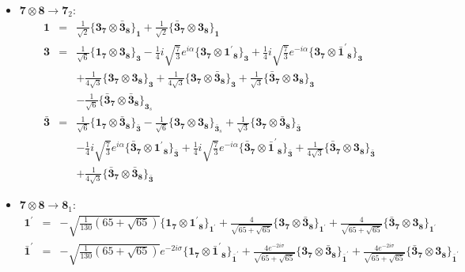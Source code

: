 \documentclass[english]{article}
\newcommand{\subcg}[3]{\big\{ {#1}\otimes{#2}\big\}^{}_{#3}}
\newcommand{\rep}[1]{\mathbf{#1}}
\begin{document}
\begin{itemize}
\item $\rep{7}\otimes\rep{8}\to\rep{7}_{2}$:
\begin{eqnarray*}
\rep{1} &=& \frac{1}{\sqrt{2}}\subcg{\rep{3}_{\rep{7}}}{\rep{\bar{3}}_{\rep{8}}}{\rep{1}}+\frac{1}{\sqrt{2}}\subcg{\rep{\bar{3}}_{\rep{7}}}{\rep{3}_{\rep{8}}}{\rep{1}}
\\
\rep{3} &=& \frac{1}{\sqrt{6}}\subcg{\rep{1}_{\rep{7}}}{\rep{3}_{\rep{8}}}{\rep{3}}-\frac{1}{4} i \sqrt{\frac{7}{3}} e^{i \alpha }\subcg{\rep{3}_{\rep{7}}}{\rep{1^{\prime}}_{\rep{8}}}{\rep{3}}+\frac{1}{4} i \sqrt{\frac{7}{3}} e^{-i \alpha }\subcg{\rep{3}_{\rep{7}}}{\rep{\bar{1}^{\prime}}_{\rep{8}}}{\rep{3}} \\ 
 & & +\frac{1}{4 \sqrt{3}}\subcg{\rep{3}_{\rep{7}}}{\rep{3}_{\rep{8}}}{\rep{3}}+\frac{1}{4 \sqrt{3}}\subcg{\rep{3}_{\rep{7}}}{\rep{\bar{3}}_{\rep{8}}}{\rep{3}}+\frac{1}{\sqrt{3}}\subcg{\rep{\bar{3}}_{\rep{7}}}{\rep{3}_{\rep{8}}}{\rep{3}} \\ 
 & & -\frac{1}{\sqrt{6}}\subcg{\rep{\bar{3}}_{\rep{7}}}{\rep{\bar{3}}_{\rep{8}}}{\rep{3}_{s}}
\\
\rep{\bar{3}} &=& \frac{1}{\sqrt{6}}\subcg{\rep{1}_{\rep{7}}}{\rep{\bar{3}}_{\rep{8}}}{\rep{\bar{3}}}-\frac{1}{\sqrt{6}}\subcg{\rep{3}_{\rep{7}}}{\rep{3}_{\rep{8}}}{\rep{\bar{3}}_{s}}+\frac{1}{\sqrt{3}}\subcg{\rep{3}_{\rep{7}}}{\rep{\bar{3}}_{\rep{8}}}{\rep{\bar{3}}} \\ 
 & & -\frac{1}{4} i \sqrt{\frac{7}{3}} e^{i \alpha }\subcg{\rep{\bar{3}}_{\rep{7}}}{\rep{1^{\prime}}_{\rep{8}}}{\rep{\bar{3}}}+\frac{1}{4} i \sqrt{\frac{7}{3}} e^{-i \alpha }\subcg{\rep{\bar{3}}_{\rep{7}}}{\rep{\bar{1}^{\prime}}_{\rep{8}}}{\rep{\bar{3}}}+\frac{1}{4 \sqrt{3}}\subcg{\rep{\bar{3}}_{\rep{7}}}{\rep{3}_{\rep{8}}}{\rep{\bar{3}}} \\ 
 & & +\frac{1}{4 \sqrt{3}}\subcg{\rep{\bar{3}}_{\rep{7}}}{\rep{\bar{3}}_{\rep{8}}}{\rep{\bar{3}}}
\end{eqnarray*}
\item $\rep{7}\otimes\rep{8}\to\rep{8}_{1}$:
\begin{eqnarray*}
\rep{1^{\prime}} &=& -\sqrt{\frac{1}{130} \left(65+\sqrt{65}\right)}\subcg{\rep{1}_{\rep{7}}}{\rep{1^{\prime}}_{\rep{8}}}{\rep{1^{\prime}}}+\frac{4}{\sqrt{65+\sqrt{65}}}\subcg{\rep{3}_{\rep{7}}}{\rep{\bar{3}}_{\rep{8}}}{\rep{1^{\prime}}}+\frac{4}{\sqrt{65+\sqrt{65}}}\subcg{\rep{\bar{3}}_{\rep{7}}}{\rep{3}_{\rep{8}}}{\rep{1^{\prime}}}
\\
\rep{\bar{1}^{\prime}} &=& -\sqrt{\frac{1}{130} \left(65+\sqrt{65}\right)} e^{-2 i \sigma }\subcg{\rep{1}_{\rep{7}}}{\rep{\bar{1}^{\prime}}_{\rep{8}}}{\rep{\bar{1}^{\prime}}}+\frac{4 e^{-2 i \sigma }}{\sqrt{65+\sqrt{65}}}\subcg{\rep{3}_{\rep{7}}}{\rep{\bar{3}}_{\rep{8}}}{\rep{\bar{1}^{\prime}}}+\frac{4 e^{-2 i \sigma }}{\sqrt{65+\sqrt{65}}}\subcg{\rep{\bar{3}}_{\rep{7}}}{\rep{3}_{\rep{8}}}{\rep{\bar{1}^{\prime}}}

\end{eqnarray*}
\end{itemize}
\end{document}
